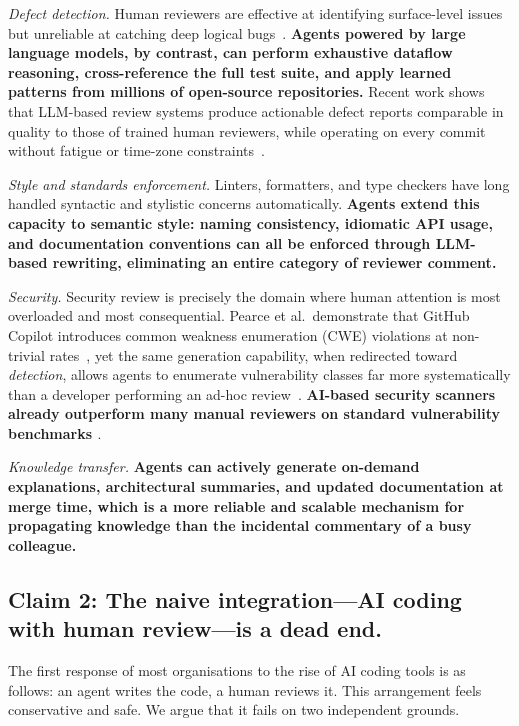 \documentclass[10pt,conference]{IEEEtran}
\begin{document}
\emph{Defect detection.}
Human reviewers are effective at identifying surface-level issues but unreliable at catching deep logical bugs~\cite{czerwonka2015code}.
\textbf{Agents powered by large language models, by contrast, can perform exhaustive dataflow reasoning, cross-reference the full test suite, and apply learned patterns from millions of open-source repositories.}
Recent work shows that LLM-based review systems produce actionable defect reports comparable in quality to those of trained human reviewers, while operating on every commit without fatigue or time-zone constraints~\cite{pornprasit2023automated,li2022codereviewer}.

\emph{Style and standards enforcement.}
Linters, formatters, and type checkers have long handled syntactic and stylistic concerns automatically.
\textbf{Agents extend this capacity to semantic style: naming consistency, idiomatic API usage, and documentation conventions can all be enforced through LLM-based rewriting, eliminating an entire category of reviewer comment.}

\emph{Security.} 
Security review is precisely the domain where human attention is most overloaded and most consequential.
Pearce et al.\ demonstrate that GitHub Copilot introduces common weakness enumeration (CWE) violations at non-trivial rates~\cite{pearce2022asleep}, yet the same generation capability, when redirected toward \emph{detection}, allows agents to enumerate vulnerability classes far more systematically than a developer performing an ad-hoc review~\cite{khoury2023secure}.
\textbf{AI-based security scanners already outperform many manual reviewers on standard vulnerability benchmarks \cite{lin2025comparing}}.

\emph{Knowledge transfer.}
\textbf{Agents can actively generate on-demand explanations, architectural summaries, and updated documentation at merge time, which is a more reliable and scalable mechanism for propagating knowledge than the incidental commentary of a busy colleague.}

\subsection{Claim 2: The naive integration---AI coding with human review---is a dead end.}

The first response of most organisations to the rise of AI coding tools is as follows: an agent writes the code, a human reviews it.
This arrangement feels conservative and safe.
We argue that it fails on two independent grounds.
\end{document}
